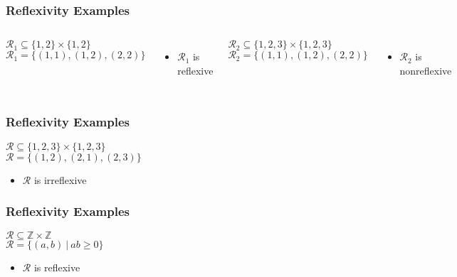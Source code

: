 \documentclass[dvipsnames]{beamer}
\begin{document}
\begin{frame}
  \frametitle{Reflexivity Examples}

  \begin{columns}[t]
    $\mathcal{R}_1 \subseteq \{1,2\} \times \{1,2\}$\\
    $\mathcal{R}_1 = \{(1,1), (1,2), (2,2)\}$

    \medskip
    \begin{itemize}
      \item $\mathcal{R}_1$ is reflexive
    \end{itemize}

    \pause
    $\mathcal{R}_2 \subseteq \{1,2,3\} \times \{1,2,3\}$\\
    $\mathcal{R}_2 = \{(1,1), (1,2), (2,2)\}$

    \medskip
    \begin{itemize}
      \item $\mathcal{R}_2$ is nonreflexive
    \end{itemize}
  \end{columns}
\end{frame}

\begin{frame}
  \frametitle{Reflexivity Examples}

  $\mathcal{R} \subseteq \{1,2,3\} \times \{1,2,3\}$\\
  $\mathcal{R} = \{(1,2), (2,1), (2,3)\}$

  \medskip
  \begin{itemize}
    \item $\mathcal{R}$ is irreflexive
  \end{itemize}
\end{frame}

\begin{frame}
  \frametitle{Reflexivity Examples}

  $\mathcal{R} \subseteq \mathbb{Z} \times \mathbb{Z}$\\
  $\mathcal{R} = \{(a,b)~|~ab \geq 0\}$

  \medskip
  \begin{itemize}
    \item $\mathcal{R}$ is reflexive
  \end{itemize}
\end{frame}
\end{document}
